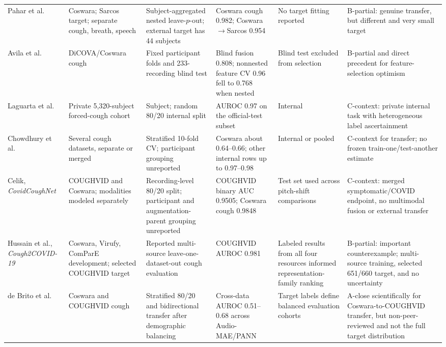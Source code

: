 \begin{longtable}{L{0.15\textwidth}L{0.14\textwidth}L{0.17\textwidth}L{0.12\textwidth}L{0.15\textwidth}L{0.17\textwidth}}
Pahar et al. \cite{pahar2022transfer} & Coswara; Sarcos target; separate cough, breath, speech & Subject-aggregated nested leave-$p$-out; external target has 44 subjects & Coswara cough 0.982; Coswara$\rightarrow$Sarcos 0.954 & No target fitting reported & B-partial: genuine transfer, but different and very small target \\
Avila et al. \cite{avila2021feature} & DiCOVA/Coswara cough & Fixed participant folds and 233-recording blind test & Blind fusion 0.808; nonnested feature CV 0.96 fell to 0.768 when nested & Blind test excluded from selection & B-partial and direct precedent for feature-selection optimism \\
Laguarta et al. \cite{laguarta2020cough} & Private 5,320-subject forced-cough cohort & Subject; random 80/20 internal split & AUROC 0.97 on the official-test subset & Internal & C-context: private internal task with heterogeneous label ascertainment \\
Chowdhury et al. \cite{chowdhury2022mcdm} & Several cough datasets, separate or merged & Stratified 10-fold CV; participant grouping unreported & Coswara about 0.64--0.66; other internal rows up to 0.97--0.98 & Internal or pooled & C-context for transfer; no frozen train-one/test-another estimate \\
Celik, \emph{CovidCoughNet} \cite{celik2023covidcoughnet} & COUGHVID and Coswara; modalities modeled separately & Recording-level 80/20 split; participant and augmentation-parent grouping unreported & COUGHVID binary AUC 0.9505; Coswara cough 0.9848 & Test set used across pitch-shift comparisons & C-context: merged symptomatic/COVID endpoint, no multimodal fusion or external transfer \\
Hussain et al., \emph{Cough2COVID-19} \cite{hussain2024cough2covid} & Coswara, Virufy, ComParE development; selected COUGHVID target & Reported multi-source leave-one-dataset-out cough evaluation & COUGHVID AUROC 0.981 & Labeled results from all four resources informed representation-family ranking & B-partial: important counterexample; multi-source training, selected 651/660 target, and no uncertainty \\
de Brito et al. \cite{debrito2025audiomae} & Coswara and COUGHVID cough & Stratified 80/20 and bidirectional transfer after demographic balancing & Cross-data AUROC 0.51--0.68 across Audio-MAE/PANN & Target labels define balanced evaluation cohorts & A-close scientifically for Coswara-to-COUGHVID transfer, but non-peer-reviewed and not the full target distribution \\

\end{longtable}
